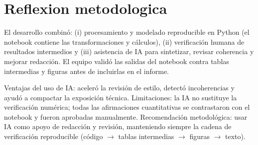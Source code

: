 \documentclass[11pt,a4paper]{article}
\begin{document}
\section{Reflexion metodologica}

El desarrollo combinó: (i) procesamiento y modelado reproducible en Python (el notebook contiene las transformaciones y cálculos), (ii) verificación humana de resultados intermedios y (iii) asistencia de IA para sintetizar, revisar coherencia y mejorar redacción. El equipo validó las salidas del notebook contra tablas intermedias y figuras antes de incluirlas en el informe.

Ventajas del uso de IA: aceleró la revisión de estilo, detectó incoherencias y ayudó a compactar la exposición técnica. Limitaciones: la IA no sustituye la verificación numérica; todas las afirmaciones cuantitativas se contrastaron con el notebook y fueron aprobadas manualmente. Recomendación metodológica: usar IA como apoyo de redacción y revisión, manteniendo siempre la cadena de verificación reproducible (código $\to$ tablas intermedias $\to$ figuras $\to$ texto).
\end{document}
